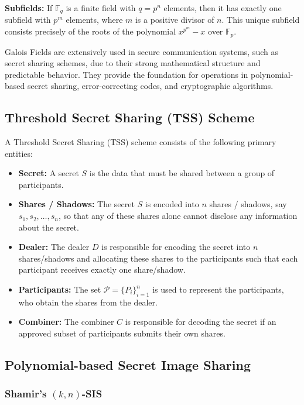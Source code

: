 \textbf{Subfields:} If $\mathbb{F}_q$ is a finite field with $q = p^n$ elements, then it has exactly one subfield with $p^m$ elements, where $m$ is a positive divisor of $n$. This unique subfield consists precisely of the roots of the polynomial $x^{p^m} - x$ over $\mathbb{F}_p$.
 
Galois Fields are extensively used in secure communication systems, such as secret sharing schemes, due to their strong mathematical structure and predictable behavior. They provide the foundation for operations in polynomial-based secret sharing, error-correcting codes, and cryptographic algorithms.
 
\subsection{Threshold Secret Sharing (TSS) Scheme}
 
A Threshold Secret Sharing (TSS) scheme consists of the following primary entities:
\begin{itemize}
    \item \textbf{Secret:} A secret $S$ is the data that must be shared between a group of participants.
    \item \textbf{Shares / Shadows:} The secret $S$ is encoded into $n$ shares / shadows, say $s_1, s_2, \ldots, s_n$, so that any of these shares alone cannot disclose any information about the secret.
    \item \textbf{Dealer:} The dealer $D$ is responsible for encoding the secret into $n$ shares/shadows and allocating these shares to the participants such that each participant receives exactly one share/shadow.
    \item \textbf{Participants:} The set $\mathcal{P} = \{P_i\}_{i=1}^{n}$ is used to represent the participants, who obtain the shares from the dealer.
    \item \textbf{Combiner:} The combiner $C$ is responsible for decoding the secret if an approved subset of participants submits their own shares.
\end{itemize}
 
\subsection{Polynomial-based Secret Image Sharing}
 
\subsubsection{Shamir's $(k, n)$-SIS}
 
